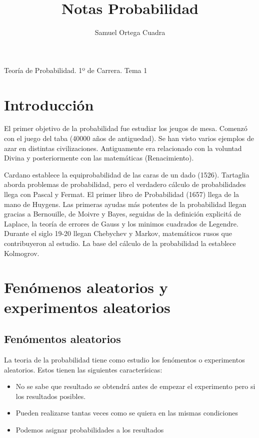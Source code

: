 \documentclass[11pt]{article}
\title{Notas Probabilidad}
\author{Samuel Ortega Cuadra}
\theoremstyle{plain}
\begin{document}
    \begin{center}
        \huge{Teoría de Probabilidad. 1º de Carrera. Tema 1}
    \end{center}
    \tableofcontents
    \newpage
    \section{Introducción} %
    \label{sec:introducción}
        El primer objetivo de la probabilidad fue estudiar los jeugos de mesa. Comenzó con el juego del taba (40000 años de antiguedad). Se han visto varios ejemplos de azar en distintas civilizaciones. Antiguamente era relacionado con la voluntad Divina y posteriormente con las matemáticas (Renacimiento).

        Cardano establece la equiprobabilidad de las caras de un dado (1526). Tartaglia aborda problemas de probabilidad, pero el verdadero cálculo de probabilidades llega con Pascal y Fermat. El primer libro de Probabilidad (1657) llega de la mano  de Huygens. Las primeras ayudas más potentes de la probabilidad llegan gracias a Bernouille, de Moivre y Bayes, seguidas de la definición explicitá de Laplace, la teoría de errores de Gauss y los minimos cuadrados de Legendre. Durante el siglo 19-20 llegan Chebychev y Markov, matemáticos rusos que contribuyeron al estudio. La base del cálculo de la probabilidad la establece Kolmogrov.
    \section{Fenómenos aleatorios y experimentos aleatorios} %
    \label{sec:fenómenos_aleatorios_y_experimentos_aleatorios}
        \subsection{Fenómentos aleatorios} %
        \label{sub:fenómentos_aleatorios}
            La teoria de la probabilidad tiene como estudio los fenómentos o experimentos aleatorios. Estos tienen las siguientes caracterísicas:
            \begin{itemize}
                \item No se sabe que resultado se obtendrá antes de empezar el experimento pero si los resultados posibles. 
                \item Pueden realizarse tantas veces como se quiera en las mismas condiciones
                \item Podemos asignar probabilidades a los resultados
            \end{itemize}
\end{document}
